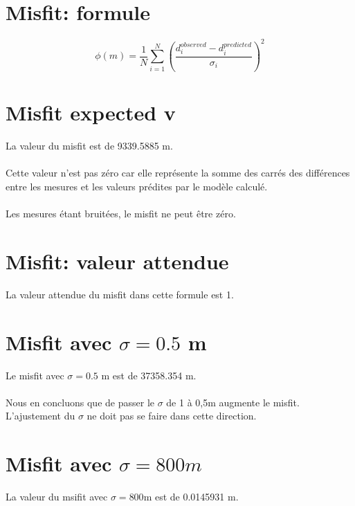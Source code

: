 \documentclass[12pt,a4paper]{extreport}
\begin{document}
\section{Misfit: formule}
\begin{equation}
\phi(m) = \frac{1}{N}\sum_{i=1}^{N}(\frac{d_i^{observed}-d_i^{predicted}}{\sigma_i})^2
\end{equation}


\section{Misfit expected v}
La valeur du misfit est de 9339.5885 m.

\paragraph*{}
Cette valeur n'est pas zéro car elle représente la somme des carrés des différences entre les mesures et les valeurs prédites par le modèle calculé. 
\paragraph*{}
Les mesures étant bruitées, le misfit ne peut être zéro.

\section{Misfit: valeur attendue}

La valeur attendue du misfit dans cette formule est 1.

\section{Misfit avec $\sigma =0.5$ m}

Le misfit avec $\sigma=0.5$ m est de 37358.354 m.
\paragraph*{}
Nous en concluons que de passer le $\sigma$ de 1 à 0,5m augmente le misfit. L'ajustement du $\sigma$ ne doit pas se faire dans cette direction.

\section{Misfit avec $\sigma = 800 m $}

La valeur du msifit avec $\sigma = 800$m est de 0.0145931 m.
\end{document}
